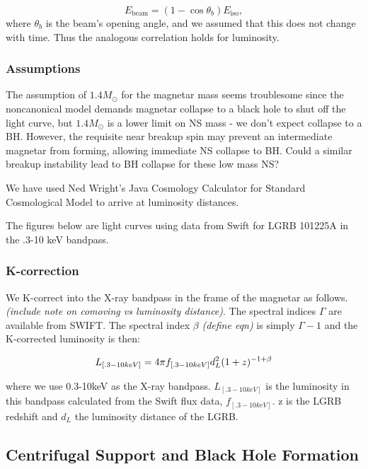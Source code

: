 \documentclass{article}
\begin{document}
\begin{equation}
 E_{\mathrm{beam}}= (1-\cos{\theta_b}) E_{\mathrm{iso}},
 \end{equation}
 where $\theta_b$ is the beam's opening angle, and we assumed that this does not change with time. Thus the analogous correlation holds for luminosity.

\subsubsection{Assumptions}

The assumption of $1.4 M_{\odot}$ for the magnetar mass seems troublesome since the noncanonical model demands magnetar collapse to a black hole to shut off the light curve, but $1.4 M_{\odot}$ is a lower limit on NS mass - we don't expect collapse to a BH. However, the requisite near breakup spin may prevent an intermediate magnetar from forming, allowing immediate NS collapse to BH. Could a similar breakup instability lead to BH collapse for these low mass NS?
\hspace{2cm}

We have used Ned Wright's Java Cosmology Calculator for Standard Cosmological Model to arrive at luminosity distances.

The figures below are light curves using data from Swift for LGRB 101225A in the .3-10 keV bandpass.


\subsubsection{K-correction}
We  K-correct into the X-ray bandpass in the frame of the magnetar as follows. 
\textit{(include note on comoving vs luminosity distance)}. The spectral indices $\Gamma$
are available from SWIFT. The spectral index $\beta$ \textit{(define eqn)} is simply $\Gamma -1$ and the K-corrected luminosity is then:

\begin{equation} L_{[.3-10 keV]} = 4\pi\* f_{[.3-10 keV]}d_{L}^2  (1+z)^{-1+\beta}
\end{equation}

where we use 0.3-10keV as the X-ray bandpass.  $L_{[.3-10 keV]}$ is the luminosity in this bandpass calculated from the Swift flux data,  $f_{[.3-10 keV]}$. z is the LGRB redshift and $d_L$ the luminosity distance of the LGRB.

\subsection{Centrifugal Support and Black Hole Formation}
\end{document}
